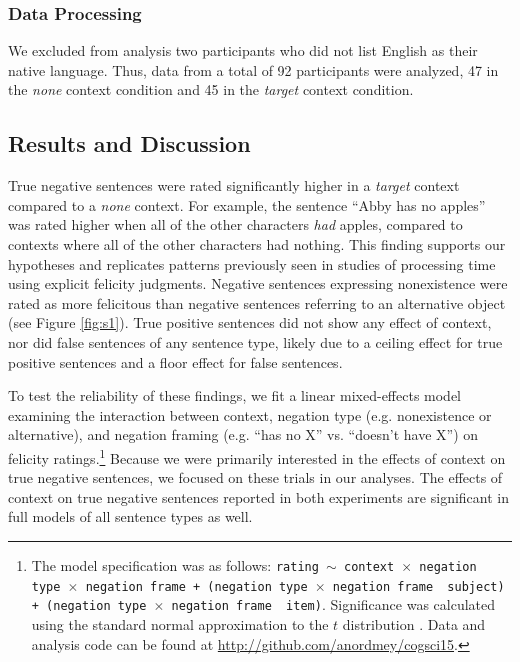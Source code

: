 \documentclass[man, noapacite]{apa2}
\begin{document}
\vspace{.2cm}

\subsubsection{Data Processing}

We excluded from analysis two participants who did not list English as their native language.  Thus, data from a total of 92 participants were analyzed, 47 in the \emph{none} context condition and 45 in the \emph{target} context condition.  

\subsection{Results and Discussion}

True negative sentences were rated significantly higher in a \emph{target} context compared to a \emph{none} context. For example, the sentence ``Abby has no apples'' was rated higher when all of the other characters \emph{had} apples, compared to contexts where all of the other characters had nothing. This finding supports our hypotheses and replicates patterns previously seen in studies of processing time using explicit felicity judgments.  Negative sentences expressing nonexistence were rated as more felicitous than negative sentences referring to an alternative object (see Figure \ref{fig:s1}). True positive sentences did not show any effect of context, nor did false sentences of any sentence type, likely due to a ceiling effect for true positive sentences and a floor effect for false sentences.
 
To test the reliability of these findings, we fit a linear mixed-effects model examining the interaction between context, negation type (e.g. nonexistence or alternative), and negation framing (e.g. ``has no X'' vs. ``doesn't have X'') on felicity ratings.\footnote{ The model specification was as follows: \texttt{rating $\sim$ context~$\times$~negation type~$\times$~negation frame + (negation type~$\times$~negation frame~\textbar~subject) +  (negation type~$\times$~negation frame~\textbar~item)}.  Significance was calculated using the standard normal approximation to the $t$ distribution \cite{barr2013}. Data and analysis code can be found at \href{http://github.com/anordmey/cogsci15}{http://github.com/anordmey/cogsci15}.} Because we were primarily interested in the effects of context on true negative sentences, we focused on these trials in our analyses.  The effects of context on true negative sentences reported in both experiments are significant in full models of all sentence types as well.
\end{document}
